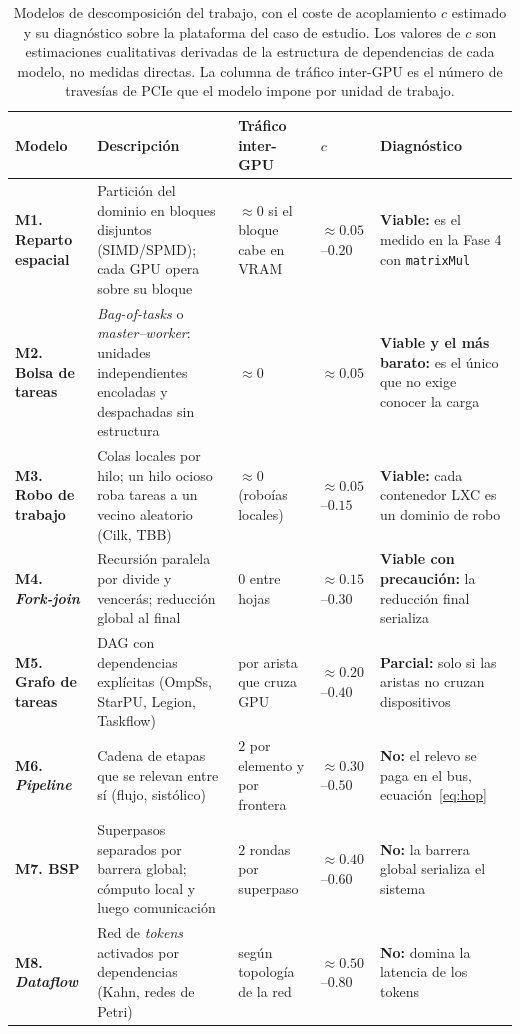 \documentclass[a4paper,11pt]{article}
\begin{document}
\begin{table}[t]
\centering
\footnotesize
\caption{Modelos de descomposición del trabajo, con el coste de acoplamiento $c$ estimado y su diagnóstico sobre la plataforma
del caso de estudio. Los valores de $c$ son estimaciones cualitativas derivadas de la estructura de dependencias de cada
modelo, no medidas directas. La columna de tráfico inter-GPU es el número de travesías de PCIe que el modelo impone por unidad
de trabajo.}
\label{tab:modelos}
\begin{tabular}{>{\raggedright\arraybackslash}p{2.2cm} >{\raggedright\arraybackslash}p{3.9cm} >{\raggedright\arraybackslash}p{2.7cm} >{\raggedright\arraybackslash}p{1.2cm} >{\raggedright\arraybackslash}p{3.7cm}}
\toprule
\textbf{Modelo} & \textbf{Descripción} & \textbf{Tráfico inter-GPU} & \textbf{$c$} & \textbf{Diagnóstico} \\
\midrule
\textbf{M1. Reparto espacial} & Partición del dominio en bloques disjuntos (SIMD/SPMD); cada GPU opera sobre su bloque & $\approx 0$ si el bloque cabe en VRAM & $\approx 0.05$--$0.20$ & \textbf{Viable:} es el medido en la Fase 4 con \texttt{matrixMul} \\
\textbf{M2. Bolsa de tareas} & \textit{Bag-of-tasks} o \textit{master--worker}: unidades independientes encoladas y despachadas sin estructura & $\approx 0$ & $\approx 0.05$ & \textbf{Viable y el más barato:} es el único que no exige conocer la carga \\
\textbf{M3. Robo de trabajo} & Colas locales por hilo; un hilo ocioso roba tareas a un vecino aleatorio (Cilk, TBB) & $\approx 0$ (roboías locales) & $\approx 0.05$--$0.15$ & \textbf{Viable:} cada contenedor LXC es un dominio de robo \\
\textbf{M4. \textit{Fork-join}} & Recursión paralela por divide y vencerás; reducción global al final & $0$ entre hojas & $\approx 0.15$--$0.30$ & \textbf{Viable con precaución:} la reducción final serializa \\
\textbf{M5. Grafo de tareas} & DAG con dependencias explícitas (OmpSs, StarPU, Legion, Taskflow) & 1 por arista que cruza GPU & $\approx 0.20$--$0.40$ & \textbf{Parcial:} solo si las aristas no cruzan dispositivos \\
\textbf{M6. \textit{Pipeline}} & Cadena de etapas que se relevan entre sí (flujo, sistólico) & $2$ por elemento y por frontera & $\approx 0.30$--$0.50$ & \textbf{No:} el relevo se paga en el bus, ecuación~\eqref{eq:hop} \\
\textbf{M7. BSP} & Superpasos separados por barrera global; cómputo local y luego comunicación & $2$ rondas por superpaso & $\approx 0.40$--$0.60$ & \textbf{No:} la barrera global serializa el sistema \\
\textbf{M8. \textit{Dataflow}} & Red de \textit{tokens} activados por dependencias (Kahn, redes de Petri) & según topología de la red & $\approx 0.50$--$0.80$ & \textbf{No:} domina la latencia de los tokens \\
\bottomrule
\end{tabular}
\end{table}
\end{document}
